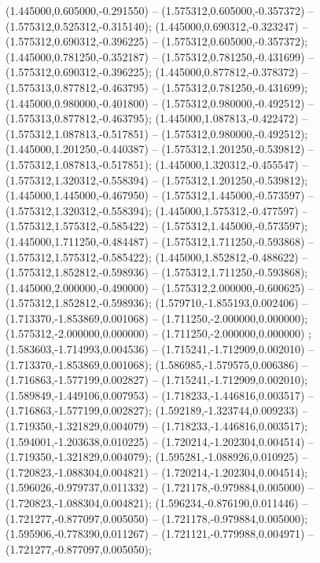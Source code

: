  (1.445000,0.605000,-0.291550) -- (1.575312,0.605000,-0.357372) -- (1.575312,0.525312,-0.315140);
 (1.445000,0.690312,-0.323247) -- (1.575312,0.690312,-0.396225) -- (1.575312,0.605000,-0.357372);
 (1.445000,0.781250,-0.352187) -- (1.575312,0.781250,-0.431699) -- (1.575312,0.690312,-0.396225);
 (1.445000,0.877812,-0.378372) -- (1.575313,0.877812,-0.463795) -- (1.575312,0.781250,-0.431699);
 (1.445000,0.980000,-0.401800) -- (1.575312,0.980000,-0.492512) -- (1.575313,0.877812,-0.463795);
 (1.445000,1.087813,-0.422472) -- (1.575312,1.087813,-0.517851) -- (1.575312,0.980000,-0.492512);
 (1.445000,1.201250,-0.440387) -- (1.575312,1.201250,-0.539812) -- (1.575312,1.087813,-0.517851);
 (1.445000,1.320312,-0.455547) -- (1.575312,1.320312,-0.558394) -- (1.575312,1.201250,-0.539812);
 (1.445000,1.445000,-0.467950) -- (1.575312,1.445000,-0.573597) -- (1.575312,1.320312,-0.558394);
 (1.445000,1.575312,-0.477597) -- (1.575312,1.575312,-0.585422) -- (1.575312,1.445000,-0.573597);
 (1.445000,1.711250,-0.484487) -- (1.575312,1.711250,-0.593868) -- (1.575312,1.575312,-0.585422);
 (1.445000,1.852812,-0.488622) -- (1.575312,1.852812,-0.598936) -- (1.575312,1.711250,-0.593868);
 (1.445000,2.000000,-0.490000) -- (1.575312,2.000000,-0.600625) -- (1.575312,1.852812,-0.598936);
 (1.579710,-1.855193,0.002406) -- (1.713370,-1.853869,0.001068) -- (1.711250,-2.000000,0.000000);
 (1.575312,-2.000000,0.000000) -- (1.711250,-2.000000,0.000000) ;
 (1.583603,-1.714993,0.004536) -- (1.715241,-1.712909,0.002010) -- (1.713370,-1.853869,0.001068);
 (1.586985,-1.579575,0.006386) -- (1.716863,-1.577199,0.002827) -- (1.715241,-1.712909,0.002010);
 (1.589849,-1.449106,0.007953) -- (1.718233,-1.446816,0.003517) -- (1.716863,-1.577199,0.002827);
 (1.592189,-1.323744,0.009233) -- (1.719350,-1.321829,0.004079) -- (1.718233,-1.446816,0.003517);
 (1.594001,-1.203638,0.010225) -- (1.720214,-1.202304,0.004514) -- (1.719350,-1.321829,0.004079);
 (1.595281,-1.088926,0.010925) -- (1.720823,-1.088304,0.004821) -- (1.720214,-1.202304,0.004514);
 (1.596026,-0.979737,0.011332) -- (1.721178,-0.979884,0.005000) -- (1.720823,-1.088304,0.004821);
 (1.596234,-0.876190,0.011446) -- (1.721277,-0.877097,0.005050) -- (1.721178,-0.979884,0.005000);
 (1.595906,-0.778390,0.011267) -- (1.721121,-0.779988,0.004971) -- (1.721277,-0.877097,0.005050);
